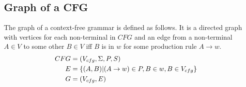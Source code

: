 	\subsection{Graph of a CFG} \label{eqn:gram2graph}
	The graph of a context-free grammar is defined as follows. It is a directed graph with vertices for each non-terminal in $CFG$ and an edge from a non-terminal $A \in V$ to some other $B \in V$ iff $B$ is in $w$ for some production rule $A \rightarrow w$.
	\begin{align} 
	\vspace{-0.3in}
	\nonumber CFG &= (V_{cfg}, \Sigma, P, S)\\
	\vspace{0.1in}
	\nonumber E &= \{(A, B) | (A \rightarrow w) \in P, B \in w, B \in V_{cfg}\}\\
	\vspace{0.1in}
	G &= (V_{cfg}, E)
	\end{align}
		
